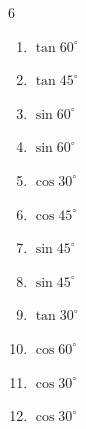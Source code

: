 \begin{multicols}{6}
\begin{enumerate}

  \item $\displaystyle \tan{60^\circ}$


  \item $\displaystyle \tan{45^\circ}$

        \phantom{$\displaystyle =1$}

  \item $\displaystyle \sin{60^\circ}$


  \item $\displaystyle \sin{60^\circ}$


\columnbreak %

  \item $\displaystyle \cos{30^\circ}$


  \item $\displaystyle \cos{45^\circ}$


  \item $\displaystyle \sin{45^\circ}$


  \item $\displaystyle \sin{45^\circ}$


  \item $\displaystyle \tan{30^\circ}$


  \item $\displaystyle \cos{60^\circ}$


  \item $\displaystyle \cos{30^\circ}$


  \item $\displaystyle \cos{30^\circ}$


\end{enumerate}
\end{multicols}

